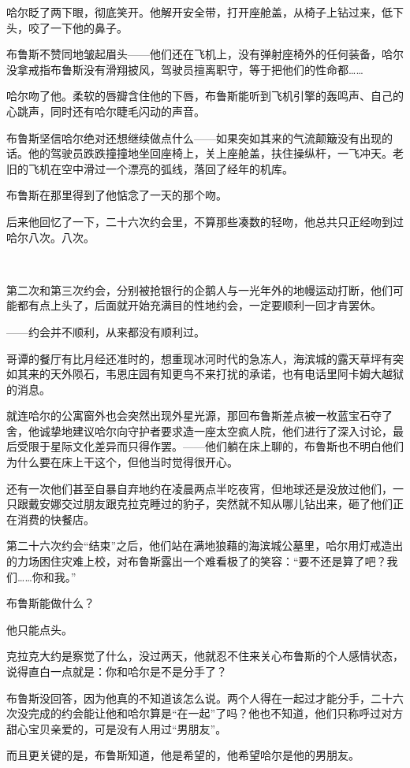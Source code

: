 \documentclass[../main]{subfiles}
\begin{document}
哈尔眨了两下眼，彻底笑开。他解开安全带，打开座舱盖，从椅子上钻过来，低下头，咬了一下他的鼻子。

布鲁斯不赞同地皱起眉头——他们还在飞机上，没有弹射座椅外的任何装备，哈尔没拿戒指布鲁斯没有滑翔披风，驾驶员擅离职守，等于把他们的性命都……

哈尔吻了他。柔软的唇瓣含住他的下唇，布鲁斯能听到飞机引擎的轰鸣声、自己的心跳声，同时还有哈尔睫毛闪动的声音。

布鲁斯坚信哈尔绝对还想继续做点什么——如果突如其来的气流颠簸没有出现的话。他的驾驶员跌跌撞撞地坐回座椅上，关上座舱盖，扶住操纵杆，一飞冲天。老旧的飞机在空中滑过一个漂亮的弧线，落回了经年的机库。

布鲁斯在那里得到了他惦念了一天的那个吻。

后来他回忆了一下，二十六次约会里，不算那些凑数的轻吻，他总共只正经吻到过哈尔八次。八次。

~\

第二次和第三次约会，分别被抢银行的企鹅人与一光年外的地幔运动打断，他们可能都有点上头了，后面就开始充满目的性地约会，一定要顺利一回才肯罢休。

——约会并不顺利，从来都没有顺利过。

哥谭的餐厅有比月经还准时的，想重现冰河时代的急冻人，海滨城的露天草坪有突如其来的天外陨石，韦恩庄园有知更鸟不来打扰的承诺，也有电话里阿卡姆大越狱的消息。

就连哈尔的公寓窗外也会突然出现外星光源，那回布鲁斯差点被一枚蓝宝石夺了舍，他诚挚地建议哈尔向守护者要求造一座太空疯人院，他们进行了深入讨论，最后受限于星际文化差异而只得作罢。——他们躺在床上聊的，布鲁斯也不明白他们为什么要在床上干这个，但他当时觉得很开心。

还有一次他们甚至自暴自弃地约在凌晨两点半吃夜宵，但地球还是没放过他们，一只跟戴安娜交过朋友跟克拉克睡过的豹子，突然就不知从哪儿钻出来，砸了他们正在消费的快餐店。

第二十六次约会“结束”之后，他们站在满地狼藉的海滨城公墓里，哈尔用灯戒造出的力场困住灾难上校，对布鲁斯露出一个难看极了的笑容：“要不还是算了吧？我们……你和我。”

布鲁斯能做什么？

他只能点头。

克拉克大约是察觉了什么，没过两天，他就忍不住来关心布鲁斯的个人感情状态，说得直白一点就是：你和哈尔是不是分手了？

布鲁斯没回答，因为他真的不知道该怎么说。两个人得在一起过才能分手，二十六次没完成的约会能让他和哈尔算是“在一起”了吗？他也不知道，他们只称呼过对方甜心宝贝亲爱的，可是没有人用过“男朋友”。

而且更关键的是，布鲁斯知道，他是希望的，他希望哈尔是他的男朋友。
\end{document}
